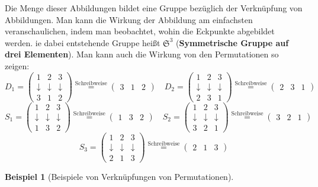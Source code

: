 \documentclass{article}
\theoremstyle{definition}
\newtheorem*{bei*}{Beispiel}
\theoremstyle{plain}
\begin{document}
Die Menge dieser Abbildungen bildet eine Gruppe bez\"uglich der Verkn\"upfung von Abbildungen. Man kann die Wirkung der Abbildung am einfachsten veranschaulichen, indem man beobachtet, wohin die Eckpunkte abgebildet werden. ie dabei entstehende Gruppe heißt $ \mathfrak{S}^3 $ (\textbf{Symmetrische Gruppe auf drei Elementen}). Man kann auch die Wirkung von den Permutationen so zeigen:
\[ 
D_1 = 
\left(
\begin{array}{ccc}
	1 & 2 & 3 \\
	\downarrow & \downarrow & \downarrow \\
	3 & 1 & 2
\end{array} 
\right)\stackrel{\text{Schreibweise}}{=} \begin{pmatrix}
	3 & 1 & 2
\end{pmatrix}
\quad
D_2 = 
\left(
\begin{array}{ccc}
	1 & 2 & 3 \\
	\downarrow & \downarrow & \downarrow \\
	2 & 3 & 1
\end{array} 
\right)\stackrel{\text{Schreibweise}}{=} \begin{pmatrix}
	2 & 3 & 1
\end{pmatrix}
 \]
\[ 
S_1 = 
\left(
\begin{array}{ccc}
	1 & 2 & 3 \\
	\downarrow & \downarrow & \downarrow \\
	1 & 3 & 2
\end{array} 
\right)\stackrel{\text{Schreibweise}}{=} \begin{pmatrix}
	1 & 3 & 2
\end{pmatrix}
\quad
S_2 = 
\left(
\begin{array}{ccc}
	1 & 2 & 3 \\
	\downarrow & \downarrow & \downarrow \\
	3 & 2 & 1
\end{array} 
\right)\stackrel{\text{Schreibweise}}{=} \begin{pmatrix}
	3 & 2 & 1
\end{pmatrix}
\]
\[ 
S_3 = 
\left(
\begin{array}{ccc}
	1 & 2 & 3 \\
	\downarrow & \downarrow & \downarrow \\
	2 & 1 & 3
\end{array} 
\right)\stackrel{\text{Schreibweise}}{=} \begin{pmatrix}
	2 & 1 & 3
\end{pmatrix}
\]
\begin{bei*}[Beispiele von Verkn\"upfungen von Permutationen]
	
\end{bei*}
\end{document}
